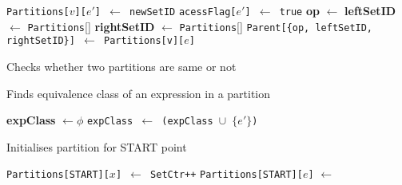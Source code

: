 \begin{algorithm}
\begin{algorithmic}
                            \State \texttt{Partitions[$v$][$e'$] $\gets$ newSetID}
                            \State \texttt{acessFlag[$e'$] $\gets$ true}
                        \EndFor
                    \EndIf
                \EndIf
            \EndFor
            \State
            \State {}
                \State \textbf{op} $\gets$ 
                \State \textbf{leftSetID} $\gets$ \texttt{Partitions}[]
                \State \textbf{rightSetID} $\gets$ \texttt{Partitions}[]
                \State \texttt{Parent[\{op, leftSetID, rightSetID\}] $\gets$ Partitions[v][$e$]}
            \EndFor
        \EndProcedure
    \end{algorithmic}
\end{algorithm}

\begin{algorithm}
    \caption{Checks whether two partitions are same or not}
    \label{alg:SamePartition}
    \begin{algorithmic}
                    \State {}
                \EndIf
            \EndFor
            \State {}
        \EndProcedure
    \end{algorithmic}
\end{algorithm}

\begin{algorithm}
    \caption{Finds equivalence class of an expression in a partition}
    \label{alg:GetClass}
    \begin{algorithmic}
            \State \textbf{expClass} $\gets \phi$
                    \State \texttt{expClass $\gets$ (expClass $\cup$ $\{e'\}$)}
                \EndIf
            \EndFor
            \State {}
        \EndProcedure
    \end{algorithmic}
\end{algorithm}

\begin{algorithm}
    \caption{Initialises partition for START point}
    \label{alg:FindInitialPartition}
    \begin{algorithmic}
                \State \texttt{Partitions[START][$x$] $\gets$ SetCtr++}
            \EndFor
                \State \texttt{Partitions[START][$e$]} $\gets$ 
            \EndFor
        \EndProcedure
    \end{algorithmic}
\end{algorithm}

